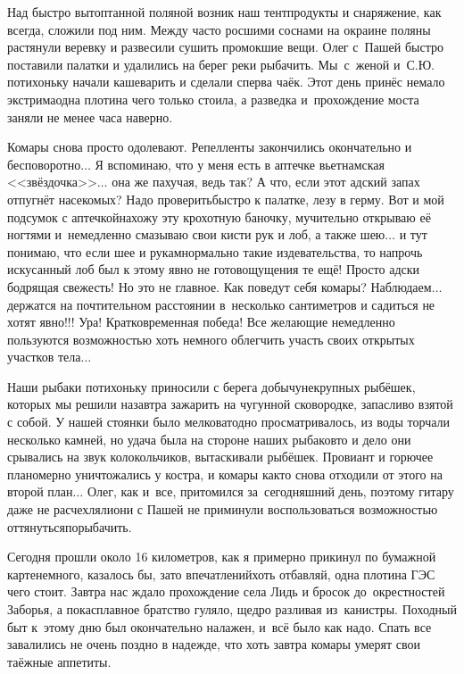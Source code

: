 Над быстро вытоптанной поляной возник наш тент\mdash продукты и снаряжение, как всегда, сложили под ним. Между часто росшими соснами на окраине поляны растянули веревку и развесили сушить промокшие вещи. Олег с~Пашей быстро поставили палатки и удалились на берег реки рыбачить. Мы~с~женой и~С.Ю. потихоньку начали кашеварить и сделали сперва чаёк. Этот день принёс немало экстрима\mdash одна плотина чего только стоила, а разведка и~прохождение моста заняли не менее часа наверно. 

Комары снова просто одолевают. Репелленты закончились окончательно и бесповоротно$\ldots$ Я вспоминаю, что у меня есть в аптечке вьетнамская <<звёздочка>>$\ldots$ она же пахучая, ведь так? А что, если этот адский запах отпугнёт насекомых? Надо проверить\mdash быстро к палатке, лезу в герму. Вот и мой подсумок с аптечкой\mdash нахожу эту крохотную баночку, мучительно открываю её ногтями и~немедленно смазываю свои кисти рук и лоб, а также шею$\ldots$ и тут понимаю, что если шее и рукам\mdash нормально такие издевательства, то напрочь искусанный лоб был к этому явно не готов\mdash ощущения те ещё! Просто адски бодрящая свежесть! Но это не главное. Как поведут себя комары? Наблюдаем$\ldots$ держатся на почтительном расстоянии в~несколько сантиметров и садиться не хотят явно!!! Ура! Кратковременная победа! Все желающие немедленно пользуются возможностью хоть немного облегчить участь своих открытых участков тела$\ldots$

Наши рыбаки потихоньку приносили с берега добычу\mdash некрупных рыбёшек, которых мы решили назавтра зажарить на чугунной сковородке, запасливо взятой с собой. У нашей стоянки было мелковато\mdash дно просматривалось, из воды торчали несколько камней, но удача была на стороне наших рыбаков\mdash то и дело они срывались на звук колокольчиков, вытаскивали рыбёшек. Провиант и горючее планомерно уничтожались у костра, и комары как\sdash то снова отходили от этого на второй план$\ldots$ Олег, как и~все, притомился за~сегодняшний день, поэтому гитару даже не расчехляли\mdash они с Пашей не приминули воспользоваться возможностью оттянуться\mdash порыбачить. 

Сегодня прошли около 16 километров, как я примерно прикинул по бумажной карте\mdash немного, казалось бы, зато впечатлений\mdash хоть отбавляй, одна плотина ГЭС чего стоит. Завтра нас ждало прохождение села Лидь и бросок до~окрестностей Заборья, а пока\mdash сплавное братство гуляло, щедро разливая из~канистры. Походный быт к~этому дню был окончательно налажен, и~всё было как надо. Спать все завалились не очень поздно в надежде, что хоть завтра комары умерят свои таёжные аппетиты.

\begin{center}
\end{center}
